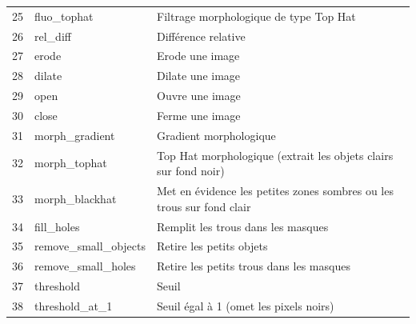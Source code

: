 \documentclass[a4paper,12pt]{report}
\begin{document}
\begin{longtable}{|c|l|P{6cm}|}
    25              & fluo\_tophat                     & Filtrage morphologique de type Top Hat                                                         \\
    26              & rel\_diff                        & Différence relative                                                                            \\
    27              & erode                            & Erode une image                                                                                \\
    28              & dilate                           & Dilate une image                                                                               \\
    29              & open                             & Ouvre une image                                                                                \\
    30              & close                            & Ferme une image                                                                                \\
    31              & morph\_gradient                  & Gradient morphologique                                                                         \\
    32              & morph\_tophat                    & Top Hat morphologique (extrait les objets clairs sur fond noir)                                \\
    33              & morph\_blackhat                  & Met en évidence les petites zones sombres ou les trous sur fond clair                          \\
    34              & fill\_holes                      & Remplit les trous dans les masques                                                             \\
    35              & remove\_small\_objects           & Retire les petits objets                                                                       \\
    36              & remove\_small\_holes             & Retire les petits trous dans les masques                                                       \\
    37              & threshold                        & Seuil                                                                                          \\
    38              & threshold\_at\_1                 & Seuil égal à 1 (omet les pixels noirs)                                                         \\

\end{longtable}
\end{document}
